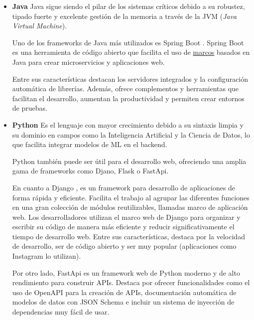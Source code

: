 \begin{itemize}
    \item \textbf{Java} 
    \newline
    Java sigue siendo el pilar de los sistemas críticos debido a su robustez, tipado fuerte y excelente gestión de la 
    memoria a través de la JVM (\textit{Java Virtual Machine}).

    Uno de los frameworks de Java más utilizados es Spring Boot \cite{springBoot}. Spring Boot es una herramienta de 
    código abierto que facilita el uso de \hyperlink{marcosTrabajo}{marcos} basados en Java para crear microservicios 
    y aplicaciones web.

    Entre sus características destacan los servidores integrados y la configuración automática de librerías. Además,
    ofrece complementos y herramientas que facilitan el desarrollo, aumentan la productividad y permiten crear entornos
    de pruebas.

    \item \textbf{Python}
    \newline
    Es el lenguaje con mayor crecimiento debido a su sintaxis limpia y su dominio en campos como la Inteligencia Artificial 
    y la Ciencia de Datos, lo que facilita integrar modelos de ML en el backend.

    Python también puede ser útil para el desarrollo web, ofreciendo una amplia gama de frameworks como Djano, Flask o
    FastApi.

    En cuanto a Django \cite{django}, es un framework para desarrollo de aplicaciones de forma rápida y eficiente. 
    Facilita el trabajo al agrupar las diferentes funciones en una gran colección de módulos reutilizables, llamadas 
    marco de aplicación web. Los desarrolladores utilizan el marco web de Django para organizar y escribir su código 
    de manera más eficiente y reducir significativamente el tiempo de desarrollo web. Entre sus características, 
    destaca por la velocidad de desarrollo, ser de código abierto y ser muy popular (aplicaciones como Instagram lo 
    utilizan).

    Por otro lado, FastApi \cite{fastapi} es un framework web de Python moderno y de alto rendimiento para construir 
    APIs. Destaca por ofrecer funcionalidades como el uso de OpenAPI para la creación de APIs, documentación automática 
    de modelos de datos con JSON Schema e incluir un sistema de inyección de dependencias muy fácil de usar.


\end{itemize}
